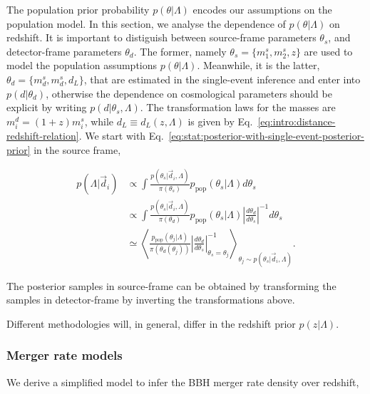 \documentclass[%
preprint,
nofootinbib,
 amsmath,amssymb,
 aps,
]{revtex4-2}
\newcommand{\given}[2]{p( #1 | #2 )}
\newcommand{\ppop}[0]{p_{\text{pop}}}
\begin{document}
The population prior probability $\given{\theta}{\Lambda}$ encodes our assumptions on the
population model. In this section, we analyse the dependence of $\given{\theta}{\Lambda}$ on
redshift. It is important to distiguish between source-frame parameters $\theta_s$, and
detector-frame parameters $\theta_d$. The former, namely $\theta_s = \{m^s_1, m^s_2, z\}$ are used
to model the population assumptions $\given{\theta}{\Lambda}$. Meanwhile, it is the latter,
$\theta_d = \{m^s_d, m^s_d, d_L\}$, that are estimated in the single-event inference and enter into
$\given{d}{\theta_d}$, otherwise the dependence on cosmological parameters should be explicit by
writing $\given{d}{\theta_s, \Lambda}$. The transformation laws for the masses are $m_i^d = (1 + z)
	m_i^s$, while $d_L \equiv d_L(z, \Lambda)$ is given by
Eq.~\eqref{eq:intro:distance-redshift-relation}. We start with
Eq.~\eqref{eq:stat:posterior-with-single-event-posterior-prior} in the source frame,

\begin{align}
	\given{\Lambda}{\vec{d}_i} & \propto \int \frac{\given{\theta_s}{\vec{d}_i, \Lambda}}{\pi(\theta_s)} \ppop(\theta_s | \Lambda ) d\theta_s                                                                                                                \\
	                           & \propto \int \frac{\given{\theta_s}{\vec{d}_i, \Lambda}}{\pi(\theta_d)} \ppop(\theta_s | \Lambda ) \left | \frac{d\theta_d}{d\theta_s} \right |^{-1} d\theta_s                                                              \\
	                           & \simeq \left \langle \frac{\ppop(\theta_j | \Lambda )}{\pi(\theta_d (\theta_j))} \left | \frac{d\theta_d}{d\theta_s} \right |^{-1}_{\theta_s=\theta_j} \right \rangle_{\theta_j \sim \given{\theta_s}{\vec{d}_i, \Lambda}}.
\end{align}

The posterior samples in source-frame can be obtained by transforming the samples in detector-frame
by inverting the transformations above.

Different methodologies will, in general, differ in the redshift prior $\given{z}{\Lambda}$.

\subsubsection{Merger rate models}
\label{sec:framework:merger-rate-models}

We derive a simplified model to infer the BBH merger rate density over redshift,
\end{document}
